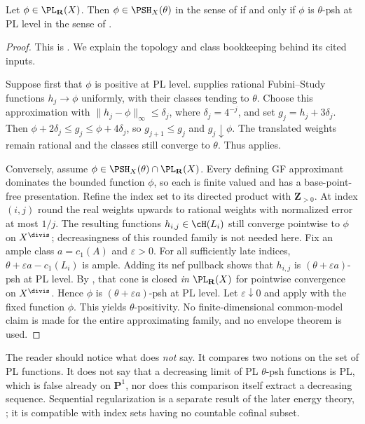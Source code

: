 \begin{proposition}
\label{prop:ch34-pl-consistency}
Let $\phi\in\PL_{\mathbf R}(X)$.  Then $\phi\in\PSH_X(\theta)$ in the
sense of  if and only if $\phi$ is $\theta$-psh at PL
level in the sense of .
\end{proposition}

\begin{proof}
This is \cite[Lemma~4.3]{BJ22}.  We explain the topology and
class bookkeeping behind its cited inputs.

Suppose first that $\phi$ is positive at PL level.
 supplies rational Fubini--Study
functions $h_j\to\phi$ uniformly, with their classes tending to $\theta$.
Choose this approximation with
$\|h_j-\phi\|_\infty\leq\delta_j$, where $\delta_j=4^{-j}$, and set
$g_j=h_j+3\delta_j$.
Then $\phi+2\delta_j\leq g_j\leq\phi+4\delta_j$,
so $g_{j+1}\leq g_j$ and $g_j\downarrow\phi$.
The translated weights remain rational and the classes still converge
to $\theta$.  Thus  applies.

Conversely, assume $\phi\in\PSH_X(\theta)\cap\PL_{\mathbf R}(X)$.
Every defining GF approximant dominates the bounded function $\phi$,
so each is finite valued and has a base-point-free presentation.
Refine the index set to its directed product with $\mathbf Z_{>0}$.
At index $(i,j)$ round the real weights upwards to rational weights
with normalized error at most $1/j$.  The resulting functions
$h_{i,j}\in\cH(L_i)$ still converge pointwise to $\phi$ on
$X^{\divis}$; decreasingness of this rounded family is not needed here.
Fix an ample class $a=c_1(A)$ and $\varepsilon>0$.
For all sufficiently late indices,
$\theta+\varepsilon a-c_1(L_i)$ is ample.  Adding its nef pullback
shows that $h_{i,j}$ is $(\theta+\varepsilon a)$-psh at PL level.
By \cite[Corollary~3.22]{BJ22}, that cone is closed \emph{in
$\PL_{\mathbf R}(X)$} for pointwise convergence on $X^{\divis}$.
Hence $\phi$ is $(\theta+\varepsilon a)$-psh at PL level.
Let $\varepsilon\downarrow0$ and apply
 with the fixed function $\phi$.
This yields $\theta$-positivity.
No finite-dimensional common-model claim is made for the entire
approximating family, and no envelope theorem is used.
\end{proof}

\begin{remark}
\label{rem:ch34-pl-consistency-scope}
The reader should notice what  does
\emph{not} say.  It compares two notions on the set of PL functions.  It
does not say that a decreasing limit of PL $\theta$-psh functions is PL,
which is false already on $\mathbf P^1$, nor does this comparison itself extract a decreasing sequence.
Sequential regularization is a separate result of the later energy
theory, \cite[Corollary~12.18]{BJ22}; it is compatible with index sets
having no countable cofinal subset.
\end{remark}

